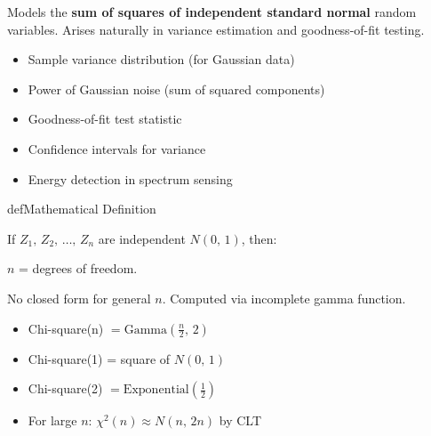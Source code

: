 

Models the \textbf{sum of squares of independent standard normal} random variables. Arises naturally in variance estimation and goodness-of-fit testing.


\begin{itemize}
\tightlist
\item
  Sample variance distribution (for Gaussian data)
\item
  Power of Gaussian noise (sum of squared components)
\item
  Goodness-of-fit test statistic
\item
  Confidence intervals for variance
\item
  Energy detection in spectrum sensing
\end{itemize}

\begin{PSbox}[unbreakable]{def}{Mathematical Definition}

If $Z_{1},\, Z_{2},\, \ldots,\, Z_{n}$ are independent $N(0,\,1)$, then:

$n$ = degrees of freedom.

\end{PSbox}




No closed form for general $n$. Computed via incomplete gamma function.






\begin{itemize}
\tightlist
\item
  Chi-square(n) $= \mathrm{Gamma}\left(\frac{n}{2},\, 2\right)$
\item
  Chi-square(1) = square of $N(0,\,1)$
\item
  Chi-square(2) $= \mathrm{Exponential}\left(\frac{1}{2}\right)$
\item
  For large $n$: $\chi^{2}(n) \approx N(n,\, 2n)$ by CLT
\end{itemize}

